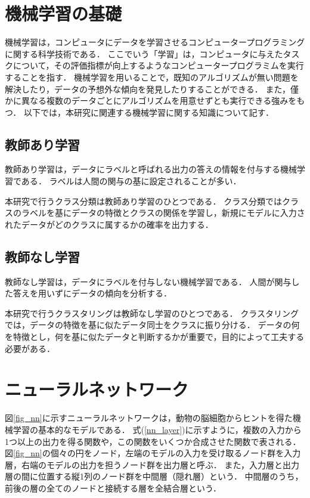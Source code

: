 \documentclass[12pt,a4j]{jreport}
\begin{document}

\section{機械学習の基礎}
機械学習は，コンピュータにデータを学習させるコンピュータープログラミングに関する科学技術である\cite{aurellen20}．
ここでいう「学習」は，コンピュータに与えたタスクについて，その評価指標が向上するようなコンピュータープログラミムを実行することを指す．
機械学習を用いることで，既知のアルゴリズムが無い問題を解決したり，データの予想外な傾向を発見したりすることができる．
また，僅かに異なる複数のデータごとにアルゴリズムを用意せずとも実行できる強みをもつ．
以下では，本研究に関連する機械学習に関する知識について記す．


\subsection{教師あり学習}
教師あり学習は，データにラベルと呼ばれる出力の答えの情報を付与する機械学習である\cite{aurellen20}．
ラベルは人間の関与の基に設定されることが多い．

本研究で行うクラス分類は教師あり学習のひとつである．
クラス分類ではクラスのラベルを基にデータの特徴とクラスの関係を学習し，新規にモデルに入力されたデータがどのクラスに属するかの確率を出力する．

\subsection{教師なし学習}
教師なし学習は，データにラベルを付与しない機械学習である\cite{aurellen20}．
人間が関与した答えを用いずにデータの傾向を分析する．

本研究で行うクラスタリングは教師なし学習のひとつである．
クラスタリングでは，データの特徴を基に似たデータ同士をクラスに振り分ける．
データの何を特徴とし，何を基に似たデータと判断するかが重要で，目的によって工夫する必要がある．


\section{ニューラルネットワーク}
図\ref{fig_nn}に示すニューラルネットワークは，動物の脳細胞からヒントを得た機械学習の基本的なモデルである\cite{aurellen20}．
式(\ref{nn_layer})に示すように，複数の入力から1つ以上の出力を得る関数や，この関数をいくつか合成させた関数で表される．
図\ref{fig_nn}の個々の円をノード，左端のモデルの入力を受け取るノード群を入力層，右端のモデルの出力を担うノード群を出力層と呼ぶ．
また，入力層と出力層の間に位置する縦1列のノード群を中間層（隠れ層）という．
中間層のうち，前後の層の全てのノードと接続する層を全結合層という．
\end{document}
